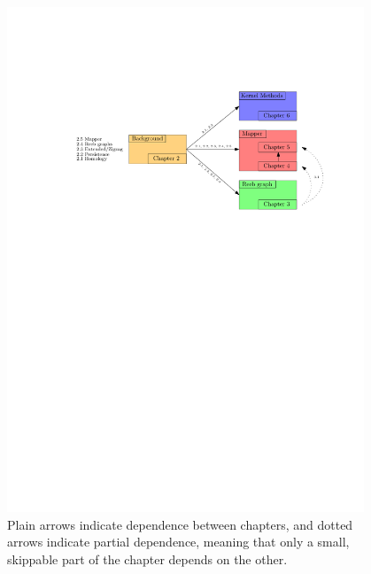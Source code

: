 \begin{figure}\centering
\includegraphics[width=0.95\textwidth]{figures/ThesisPlan}
\caption[Plan of the thesis]{\label{fig:thesis} Plain arrows indicate dependence between chapters, and dotted arrows indicate partial dependence, meaning 
that only a small, skippable part of the chapter depends on the other. 
}
\end{figure}





